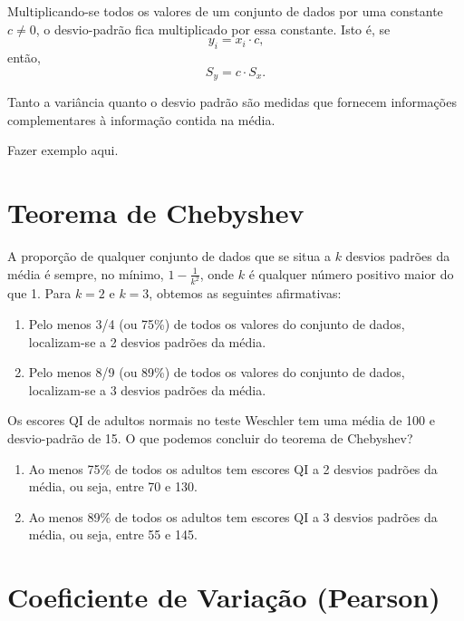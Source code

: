 \documentclass[11pt,fleqn]{book}
\numberwithin{mpicture}{chapter}
\numberwithin{mtable}{chapter}
\numberwithin{mframe}{chapter}
\begin{document}
\begin{theorem}
	Multiplicando-se todos os valores de um conjunto de dados por uma constante $c\neq 0$, o desvio-padrão fica multiplicado por essa constante. Isto é, se
	\[
		y_i=x_i\cdot c\text{,}
	\]
	então,
	\[
		S_y=c\cdot S_x\text{.}
	\]
\end{theorem}

Tanto a variância quanto o desvio padrão são medidas que fornecem informações complementares à informação contida na média.

{\color{red}Fazer exemplo aqui.}

\section{Teorema de Chebyshev}

A proporção de qualquer conjunto de dados que se situa a $k$ desvios padrões da média é sempre, no mínimo, $1-\frac{1}{k^2}$, onde $k$ é qualquer número positivo maior do que 1. Para $k=2$ e $k=3$, obtemos as seguintes afirmativas:

\begin{enumerate}
	\item Pelo menos 3/4 (ou 75\%) de todos os valores do conjunto de dados, localizam-se a 2 desvios padrões da média.
	
	\item Pelo menos 8/9 (ou 89\%) de todos os valores do conjunto de dados, localizam-se a 3 desvios padrões da média.
\end{enumerate}

\begin{example}
	Os escores QI de adultos normais no teste Weschler tem uma média de 100 e desvio-padrão de 15. O que podemos concluir do teorema de Chebyshev?
	
	\begin{enumerate}
		\item Ao menos 75\% de todos os adultos tem escores QI a 2 desvios padrões da média, ou seja, entre 70 e 130.
		
		\item Ao menos 89\% de todos os adultos tem escores QI a 3 desvios padrões da média, ou seja, entre 55 e 145.
	\end{enumerate}
\end{example}

\section{Coeficiente de Variação (Pearson)}
\end{document}
